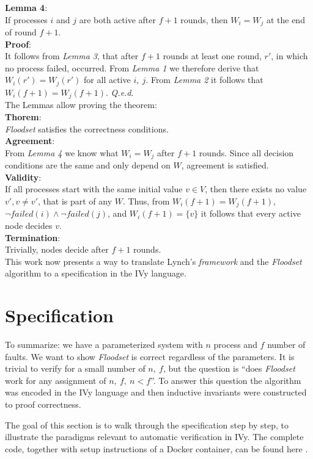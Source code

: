 \documentclass[fleqn]{article}
\begin{document}
\noindent \textbf{Lemma 4}:\\
If processes $i$ and $j$ are both active after $f+1$ rounds, then $W_i = W_j$ at the end of round $f + 1$.\\
\textbf{Proof}:\\
It follows from \textit{Lemma 3}, that after $f+1$ rounds at least one round, $r'$, in which no process failed, occurred. From \textit{Lemma 1} we therefore derive that $W_i(r') = W_j(r')$ for all active $i,\ j$.
From \textit{Lemma 2} it follows that $W_i(f+1) = W_j(f+1)$. \textit{Q.e.d}.\\

\noindent The Lemmas allow proving the theorem:\\
\noindent \textbf{Thorem}:\\
\textit{Floodset} satisfies the correctness conditions.\\
\textbf{Agreement}:\\
From \textit{Lemma 4} we know what $W_i = W_j$ after $f+1$ rounds. Since all decision conditions are the same and only depend on $W$, agreement is satisfied.\\
\textbf{Validity}:\\
If all processes start with the same initial value $v \in V$, then there exists no value $v', v \neq v'$, that is part of any $W$. Thus, from $W_i(f+1) = W_j(f+1)$, $\neg failed(i) \land \neg failed(j)$, and $W_i(f+1) = \{v\}$ it follows
that every active node decides $v$.\\
\textbf{Termination}:\\
Trivially, nodes decide after $f+1$ rounds.\\

This work now presents a way to translate Lynch's \textit{framework} and the \textit{Floodset} algorithm to a specification in the IVy language.

\section{Specification}
To summarize: we have a parameterized system with $n$ process and $f$ number of faults. We want to show \textit{Floodset} is correct regardless of the parameters.
It is trivial to verify for a small number of $n,\ f$, but the question is ``does \textit{Floodset} work for any assignment of $n,\ f,\ n < f$''.
To answer this question the algorithm was encoded in the IVy language and then inductive invariants were constructed to proof correctness.

The goal of this section is to walk through the specification step by step, to illustrate the paradigms relevant to automatic verification in IVy. The complete code, together with setup instructions of a Docker container, can be found here \cite{github}.
\end{document}
